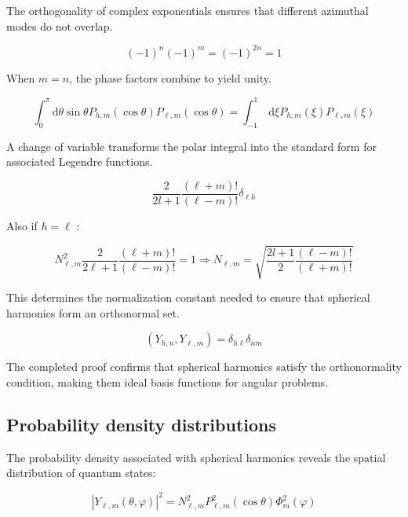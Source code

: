 \documentclass[italian]{HKNdocument}
\begin{document}
The orthogonality of complex exponentials ensures that different azimuthal modes do not overlap.

\begin{equation}
(-1)^{n}(-1)^{m}=(-1)^{2 n}=1 \label{eq:8.54}
\end{equation}

When $m=n$, the phase factors combine to yield unity.

\begin{equation}
\int_{0}^{\pi} \mathrm{d} \theta \sin \theta P_{h, m}(\cos \theta) P_{\ell, m}(\cos \theta)=\int_{-1}^{1} \mathrm{~d} \xi P_{h, m}(\xi) P_{\ell, m}(\xi) \label{eq:8.55}
\end{equation}

A change of variable transforms the polar integral into the standard form for associated Legendre functions.

\begin{equation}
\frac{2}{2 l+1} \frac{(\ell+m)!}{(\ell-m)!} \delta_{\ell h} \label{eq:8.56}
\end{equation}

Also if $h=\ell$ :

\begin{equation}
N_{\ell, m}^{2} \frac{2}{2 \ell+1} \frac{(\ell+m)!}{(\ell-m)!}=1 \Longrightarrow N_{\ell, m}=\sqrt{\frac{2 l+1}{2} \frac{(\ell-m)!}{(\ell+m)!}} \label{eq:8.57}
\end{equation}

This determines the normalization constant needed to ensure that spherical harmonics form an orthonormal set.

\begin{equation}
\left(Y_{h, n}, Y_{\ell, m}\right)=\delta_{h \ell} \delta_{n m} \label{eq:8.58}
\end{equation}

The completed proof confirms that spherical harmonics satisfy the orthonormality condition, making them ideal basis functions for angular problems.

\subsection{Probability density distributions}
The probability density associated with spherical harmonics reveals the spatial distribution of quantum states:

\begin{equation}
\left|Y_{\ell, m}(\theta, \varphi)\right|^{2}=N_{\ell, m}^{2} P_{\ell, m}^{2}(\cos \theta) \Phi_{m}^{2}(\varphi) \label{eq:8.59}
\end{equation}
\end{document}
